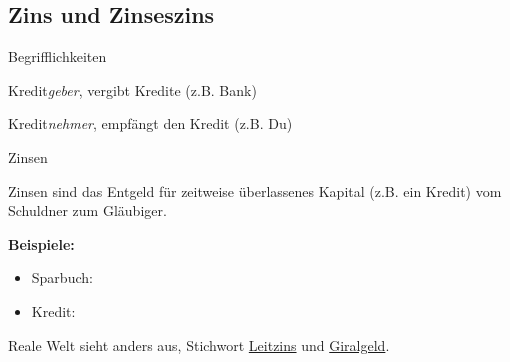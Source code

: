 \documentclass{beamer}
\begin{document}
		\subsection{Zins und Zinseszins}
		
			\begin{frame}{Begrifflichkeiten}
				\begin{description}[labelwidth=0cm]
					\item[Gläubiger] Kredit\textit{geber}, vergibt Kredite (z.B. Bank)\pause
					\item[Schuldner] Kredit\textit{nehmer}, empfängt den Kredit (z.B. Du)
				\end{description}
			\end{frame}
		
			\begin{frame}{Zinsen}
				\begin{definition}
					Zinsen sind das Entgeld für zeitweise überlassenes Kapital (z.B. ein Kredit) vom Schuldner zum Gläubiger.
				\end{definition}
				\textbf{Beispiele:}
				\begin{multicols}{2}
					\begin{itemize}
						\item Sparbuch:\\
						\columnbreak
						\item Kredit:\\
					\end{itemize}
				\end{multicols}
				\vspace{-0.25cm}
				{\tiny Reale Welt sieht anders aus, Stichwort \href{https://de.wikipedia.org/wiki/Leitzins}{Leitzins} und \href{https://de.wikipedia.org/wiki/Buchgeld}{Giralgeld}.}
			\end{frame}
		
\end{document}
